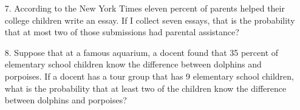 \documentclass[a4paper]{article}
\begin{document}
\begin{itemize}
	\item[7.] According to the New York Times eleven percent of parents helped their college children write an essay. If I collect seven essays, that is the probability that at most two of those submissions had parental assistance?
	\item[8.] Suppose that at a famous aquarium, a docent found that 35 percent of elementary school children know the difference between dolphins and porpoises. If a docent has a tour group that has 9 elementary school children, what is the probability that at least two of the children know the difference between dolphins and porpoises?   
\end{itemize}
\end{document}

